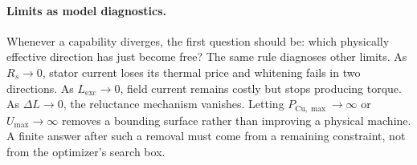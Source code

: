 

\paragraph{Limits as model diagnostics.}
Whenever a capability diverges, the first question should be: which
physically effective direction has just become free?  The same rule diagnoses
other limits.  As \(R_s\to0\), stator current loses its thermal price and
whitening fails in two directions.  As \(L_{\mathrm{exc}}\to0\), field
current remains costly but stops producing torque.  As \(\Delta L\to0\), the
reluctance mechanism vanishes.  Letting \(P_{\mathrm{Cu},\max}\to\infty\) or
\(U_{\max}\to\infty\) removes a bounding surface rather than improving a
physical machine.  A finite answer after such a removal must come from a
remaining constraint, not from the optimizer's search box.

